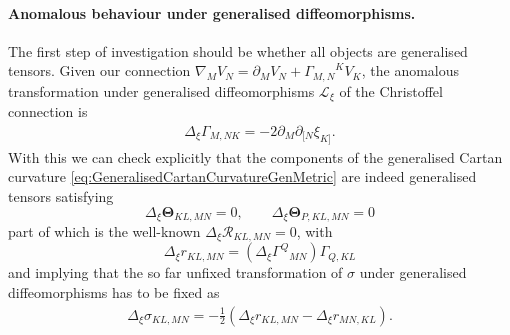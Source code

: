 \documentclass[11pt,a4paper]{article}
\numberwithin{equation}{section}
\begin{document}
\paragraph{Anomalous behaviour under generalised diffeomorphisms.} The first step of investigation should be whether all objects are generalised tensors. Given our connection $\nabla_M V_N = \partial_M V_N + {\Gamma_{M,N}}^K V_K$, the anomalous transformation under generalised diffeomorphisms $\mathcal{L}_\xi$ of the Christoffel connection is
\begin{align}
    \Delta_\xi {\Gamma_{M,NK}} = - 2 \partial_{M} \partial_{[N} \xi_{K]}.
\end{align}
With this we can check explicitly that the components of the generalised Cartan curvature \eqref{eq:GeneralisedCartanCurvatureGenMetric} are indeed generalised tensors satisfying
\begin{equation}
    \Delta_\xi \mathbf{\Theta}_{KL,MN} = 0 , \qquad  \Delta_\xi \mathbf{\Theta}_{P,KL,MN} = 0
\end{equation}
part of which is the well-known $\Delta_\xi \mathcal{R}_{KL,MN} = 0$, with
\begin{equation}
    \Delta_\xi r_{KL,MN} = (\Delta_\xi {\Gamma^Q}_{MN} ){\Gamma}_{Q,KL}
\end{equation}
and implying that the so far unfixed transformation of $\sigma$ under generalised diffeomorphisms has to be fixed as
\begin{align}
  \Delta_\xi \sigma_{KL,MN} = - \frac{1}{2} ( \Delta_\xi r_{KL,MN} - \Delta_\xi r_{MN,KL} ).
\end{align}
\end{document}
